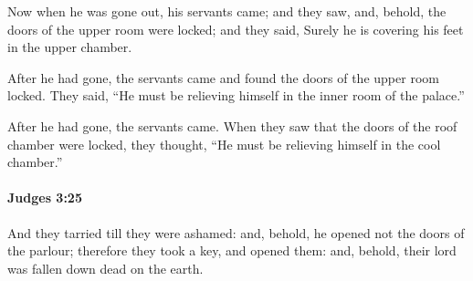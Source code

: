 			\begin{versebox}
					\item[BHS] 
					\item[ASV] Now when he was gone out, his servants came; and they saw, and, behold, the doors of the upper room were locked; and they said, Surely he is covering his feet in the upper chamber.
					\item[NIV] After he had gone, the servants came and found the doors of the upper room locked. They said, “He must be relieving himself in the inner room of the palace.”
					\item[NRSV] After he had gone, the servants came. When they saw that the doors of the roof chamber were locked, they thought, “He must be relieving himself in the cool chamber.”
			\end{versebox}

		\paragraph{Judges 3:25} %
			\label{JUDGES-3-25}

			And they tarried till they were ashamed: and, behold, he opened not the doors of the parlour; therefore they took a key, and opened them: and, behold, their lord was fallen down dead on the earth.

